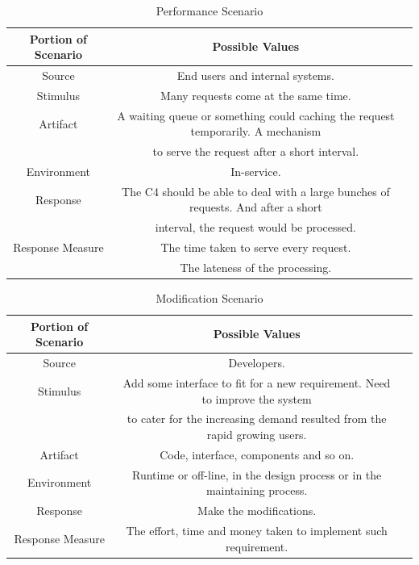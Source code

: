 \documentclass{article}
\begin{document}
	\begin{center}
		\begin{table}[!htb]
		\begin{tabular}{ccc}
		\toprule  
		Portion of Scenario & Possible Values\\
		\midrule 
		Source & End users and internal systems.\\
		Stimulus & Many requests come at the same time.\\
		Artifact & A waiting queue or something could caching the request temporarily. A mechanism  \\
		& to serve the request after a short interval.\\
		Environment & In-service. \\
		Response & The C4 should be able to deal with a large bunches of requests. And after a short\\ 
		& interval, the request would be processed.\\
		Response Measure & The time taken to serve every request.\\
		& The lateness of the processing.\\
		\bottomrule
		\end{tabular}
		\caption{Performance Scenario}
		\end{table}
	\end{center}

	\begin{center}
		\begin{table}[!htb]
		\begin{tabular}{ccc}
		\toprule  
		Portion of Scenario & Possible Values\\
		\midrule 
		Source & Developers.\\
		Stimulus & Add some interface to fit for a new requirement. Need to improve the system \\
		& to cater for the increasing demand resulted from the rapid growing users.\\
		Artifact & Code, interface, components and so on.\\
		Environment & Runtime or off-line, in the design process or in the maintaining process.\\
		Response & Make the modifications.\\
		Response Measure & The effort, time and money taken to implement such requirement.\\
		\bottomrule
		\end{tabular}
		\caption{Modification Scenario}
		\end{table}
	\end{center}
\end{document}
